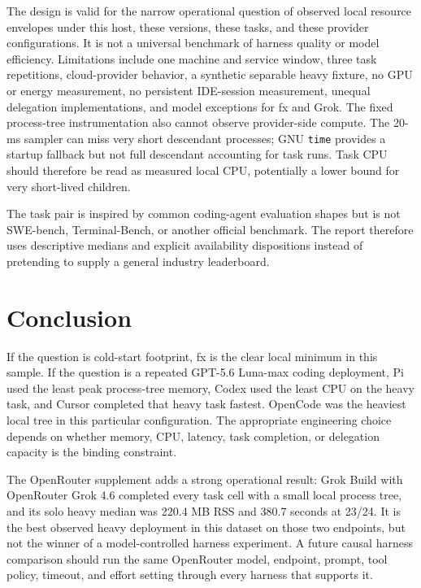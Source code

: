 \documentclass[11pt]{article}
\begin{document}
The design is valid for the narrow operational question of observed local
resource envelopes under this host, these versions, these tasks, and these
provider configurations. It is not a universal benchmark of harness quality or
model efficiency. Limitations include one machine and service window, three
task repetitions, cloud-provider behavior, a synthetic separable heavy fixture,
no GPU or energy measurement, no persistent IDE-session measurement, unequal
delegation implementations, and model exceptions for fx and Grok. The fixed
process-tree instrumentation also cannot observe provider-side compute. The
20-ms sampler can miss very short descendant processes; GNU \texttt{time}
provides a startup fallback but not full descendant accounting for task runs.
Task CPU should therefore be read as measured local CPU, potentially a lower
bound for very short-lived children.

The task pair is inspired by common coding-agent evaluation shapes but is not
SWE-bench, Terminal-Bench, or another official benchmark. The report therefore
uses descriptive medians and explicit availability dispositions instead of
pretending to supply a general industry leaderboard.

\section{Conclusion}

If the question is cold-start footprint, fx is the clear local minimum in this
sample. If the question is a repeated GPT-5.6 Luna-max coding deployment, Pi
used the least peak process-tree memory, Codex used the least CPU on the heavy
task, and Cursor completed that heavy task fastest. OpenCode was the heaviest
local tree in this particular configuration. The appropriate engineering choice
depends on whether memory, CPU, latency, task completion, or delegation
capacity is the binding constraint.

The OpenRouter supplement adds a strong operational result: Grok Build with
OpenRouter Grok 4.6 completed every task cell with a small local process tree,
and its solo heavy median was 220.4 MB RSS and 380.7 seconds at 23/24. It is the
best observed heavy deployment in this dataset on those two endpoints, but not
the winner of a model-controlled harness experiment. A future causal harness
comparison should run the same OpenRouter model, endpoint, prompt, tool policy,
timeout, and effort setting through every harness that supports it.
\end{document}

